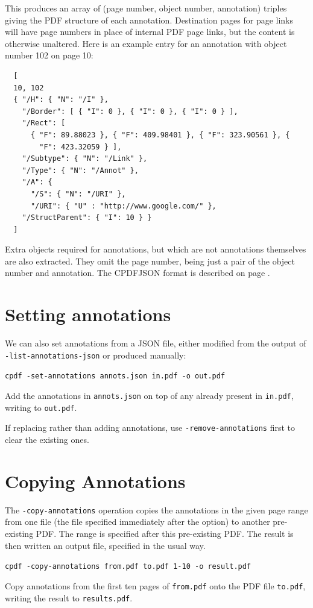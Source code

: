 \documentclass{book}
\begin{document}
\noindent This produces an array of (page number, object number, annotation) triples giving the PDF structure of each annotation. Destination pages for page links will have page numbers in place of internal PDF page links, but the content is otherwise unaltered. Here is an example entry for an annotation with object number 102 on page 10:

{\small\begin{verbatim}
  [
  10, 102
  { "/H": { "N": "/I" },
    "/Border": [ { "I": 0 }, { "I": 0 }, { "I": 0 } ],
    "/Rect": [
      { "F": 89.88023 }, { "F": 409.98401 }, { "F": 323.90561 }, {
        "F": 423.32059 } ],
    "/Subtype": { "N": "/Link" },
    "/Type": { "N": "/Annot" },
    "/A": {
      "/S": { "N": "/URI" },
      "/URI": { "U" : "http://www.google.com/" },
    "/StructParent": { "I": 10 } }
  ]
\end{verbatim}}

\noindent Extra objects required for annotations, but which are not annotations themselves are also extracted. They omit the page number, being just a pair of the object number and annotation. The CPDFJSON format is described on page \pageref{cpdfjson}.

\section{Setting annotations}

We can also set annotations from a JSON file, either modified from the output of \texttt{-list-annotations-json} or produced manually:

  \begin{framed}
    \noindent\small\verb!cpdf -set-annotations annots.json in.pdf -o out.pdf !
    
    \vspace{2.5mm}
    \noindent Add the annotations in \texttt{annots.json} on top of any already present in \texttt{in.pdf}, writing to \texttt{out.pdf}.

  \end{framed}

\noindent If replacing rather than adding annotations, use \texttt{-remove-annotations} first to clear the existing ones.


  \section{Copying Annotations}
  The \texttt{-copy-annotations} operation copies the annotations in the given
page range from one file (the file specified immediately after the option) to
another pre-existing PDF. The range is specified after this pre-existing PDF.
The result is then written an output file, specified in the usual way.
  \begin{framed}
    \noindent\small\verb!cpdf -copy-annotations from.pdf to.pdf 1-10 -o result.pdf !
    
    \vspace{2.5mm}
    \noindent Copy annotations from the first ten pages of \texttt{from.pdf}
onto the PDF file \texttt{to.pdf}, writing the result to \texttt{results.pdf}.

  \end{framed}
\end{document}
